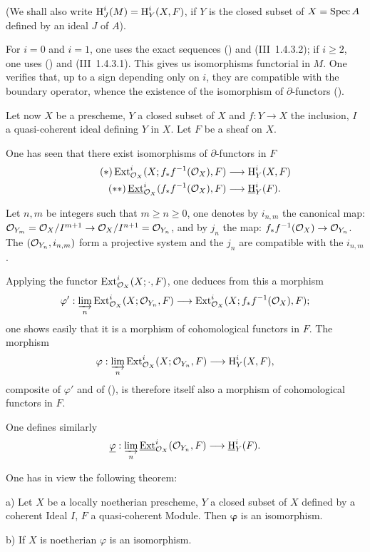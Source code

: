 \noindent
(We shall also write $\operatorname{H}_J^i(M)=\operatorname{H}_Y^i(X, F)$, if $Y$ is the closed subset of $X=\operatorname{Spec} A$ defined by an ideal $J$ of $A$).

For $i=0$ and $i=1$, one uses the exact sequences () and (\EGA III~1.4.3.2); if $i\geq2$, one uses () and (\EGA III~1.4.3.1). This gives us isomorphisms functorial in $M$. One verifies that, up to a sign depending only on $i$, they are compatible with the boundary operator, whence the existence of the isomorphism of $\partial$-functors ().

Let now $X$ be a prescheme, $Y$ a closed subset of $X$ and $f:Y\to X$ the inclusion, $I$ a quasi-coherent ideal defining $Y$ in $X$. Let $F$ be a sheaf on $X$.

One has seen that there exist isomorphisms of $\partial$-functors in $F$
\begin{align}
\label{eq:II.5.*} \tag{$*$} \Ext_{\OX}^i(X;f_{*}f^{-1}(\OX), F) &\to \H_Y^i(X, F) \\
\label{eq:II.5.**} \tag{$**$} \SheafExt_{\OX}^i(f_{*}f^{-1}(\OX), F) &\to \SheafH_Y^i(F).
\end{align}

Let $n, m$ be integers such that $m\geq n\geq 0$, one denotes by $i_{n, m}$ the canonical map: $\Oo_{Y_m}=\OX/I^{m+1} \to\OX/I^{n+1}=\Oo_{Y_n}$, and by $j_n$ the map: $f_{*}f^{-1}(\OX)\to\Oo_{Y_n}$. The $({\mathcal O}_{Y_n}, i_{n, m})$ form a projective system and the $j_n$ are compatible with the $i_{n, m}$.

Applying the functor $\operatorname{Ext}_{\mathcal{O}_X}^i(X;\cdot, F)$, one deduces from this a morphism
\[
\varphi': \varinjlim_{n} \Ext_{\OX}^i(X;\Oo_{Y_n}, F) \to \Ext_{\OX}^i(X;f_{*}f^{-1}(\OX), F);
\]
one shows easily that it is a morphism of cohomological functors in $F$. The morphism
\[
\varphi: \varinjlim_{n} \Ext_{\OX}^i(X;\Oo_{Y_n}, F) \to \H_Y^i(X, F),
\]
composite of $\varphi'$ and of (), is therefore itself also a morphism of cohomological functors in $F$.

One defines similarly
\[
\underline{\varphi}: \varinjlim_{n} \SheafExt_{\OX}^i(\Oo_{Y_n}, F) \to {\SheafH}_Y^i(F).
\]

One has in view the following theorem:

\begin{suptheorem} \label{II.6} \textup{a)}
Let $X$ be a locally noetherian prescheme, $Y$ a closed subset of $X$ defined by a coherent Ideal $I$, $F$ a quasi-coherent Module. Then $\boldsymbol{\varphi}$ is an isomorphism.

\textup{b)} If $X$ is noetherian $\varphi$ is an isomorphism.
\end{suptheorem}

